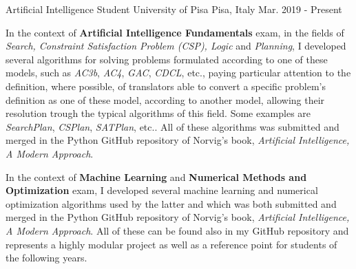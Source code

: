 

\begin{cventries}

  \cventry
    {Artificial Intelligence Student} %
    {University of Pisa} %
    {Pisa, Italy} %
    {Mar. 2019 - Present} %
    {   
      \begin{cvitems} %
        \item {In the context of \textbf{Artificial Intelligence Fundamentals} exam, in the fields of \textit{Search, Constraint Satisfaction Problem (CSP), Logic} and \textit{Planning}, I developed several algorithms for solving problems formulated according to one of these models, such as \textit{AC3b}, \textit{AC4}, \textit{GAC}, \textit{CDCL}, etc., paying particular attention to the definition, where possible, of translators able to convert a specific problem's definition as one of these model, according to another model, allowing their resolution trough the typical algorithms of this field. Some examples are \textit{SearchPlan}, \textit{CSPlan}, \textit{SATPlan}, etc.. All of these algorithms was submitted and merged in the Python GitHub repository of Norvig's book, \textit{Artificial Intelligence, A Modern Approach}.}
        \item {In the context of \textbf{Machine Learning} and \textbf{Numerical Methods and Optimization} exam, I developed several machine learning and numerical optimization algorithms used by the latter and which was both submitted and merged in the Python GitHub repository of Norvig's book, \textit{Artificial Intelligence, A Modern Approach}. All of these can be found also in my GitHub repository and represents a highly modular project as well as a reference point for students of the following years.}
      \end{cvitems}
    }
    

\end{cventries}
